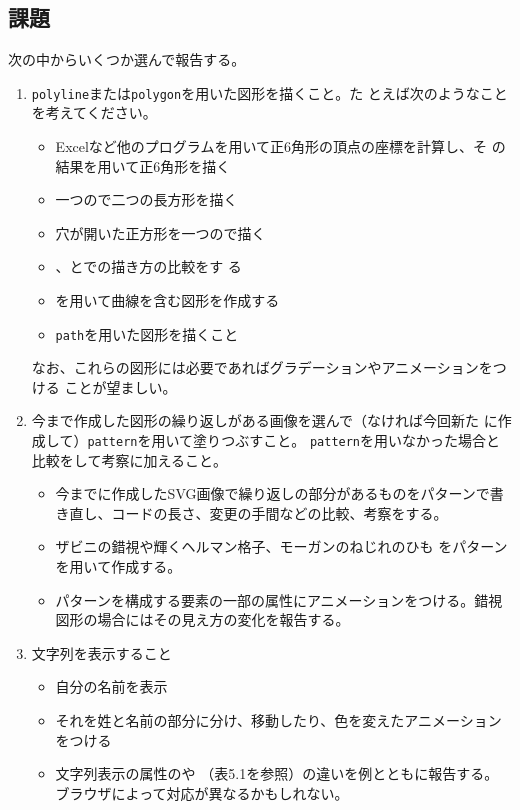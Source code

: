 \documentclass[a4j]{jarticle}
\begin{document}
\subsection{課題}
次の中からいくつか選んで報告する。
\begin{enumerate}
 \item \texttt{polyline}または\texttt{polygon}を用いた図形を描くこと。た
       とえば次のようなことを考えてください。
   \begin{itemize}
    \item Excelなど他のプログラムを用いて正6角形の頂点の座標を計算し、そ
          の結果を用いて正6角形を描く
    \item 一つので二つの長方形を描く
    \item 穴が開いた正方形を一つので描く
    \item {}、とでの描き方の比較をす
          る
    \item {}を用いて曲線を含む図形を作成する
   \end{itemize}
\begin{itemize}
 \item \texttt{path}を用いた図形を描くこと
\end{itemize}
なお、これらの図形には必要であればグラデーションやアニメーションをつける
       ことが望ましい。
 \item 今まで作成した図形の繰り返しがある画像を選んで（なければ今回新た
       に作成して）\texttt{pattern}を用いて塗りつぶすこと。
       \texttt{pattern}を用いなかった場合と比較をして考察に加えること。
 \begin{itemize}
  \item 今までに作成したSVG画像で繰り返しの部分があるものをパターンで書
        き直し、コードの長さ、変更の手間などの比較、考察をする。
  \item ザビニの錯視や輝くヘルマン格子、モーガンのねじれのひも
        をパターンを用いて作成する。
  \item パターンを構成する要素の一部の属性にアニメーションをつける。錯視
        図形の場合にはその見え方の変化を報告する。
 \end{itemize}
 \item 文字列を表示すること
\begin{itemize}
 \item 自分の名前を表示
 \item それを姓と名前の部分に分け、移動したり、色を変えたアニメーション
       をつける
 \item 文字列表示の属性のや
       （表5.1を参照）の違いを例とともに報告する。
       ブラウザによって対応が異なるかもしれない。
\end{itemize}
\end{enumerate}
\end{document}

